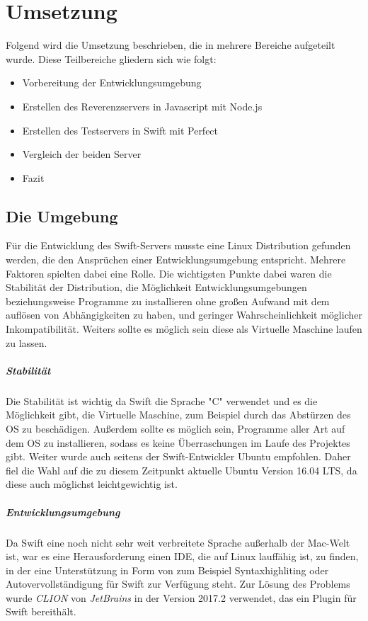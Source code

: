 \chapter{Umsetzung}\label{chap:Umsetzung}

\chapterstart

Folgend wird die Umsetzung beschrieben, die in mehrere Bereiche aufgeteilt wurde. Diese Teilbereiche gliedern sich wie folgt:
\begin{itemize}
	\item Vorbereitung der Entwicklungsumgebung
	\item Erstellen des Reverenzservers in Javascript mit Node.js
	\item Erstellen des Testservers in Swift mit Perfect
	\item Vergleich der beiden Server
	\item Fazit
\end{itemize}

\section{Die Umgebung}
\label{sec:dieumgebung}

Für die Entwicklung des Swift-Servers musste eine Linux Distribution gefunden werden, die den Ansprüchen einer Entwicklungsumgebung entspricht. Mehrere Faktoren spielten dabei eine Rolle. Die wichtigsten Punkte dabei waren die Stabilität der Distribution, die Möglichkeit Entwicklungsumgebungen beziehungsweise Programme zu installieren ohne großen Aufwand mit dem auflösen von Abhängigkeiten zu haben, und geringer Wahrscheinlichkeit möglicher Inkompatibilität. Weiters sollte es möglich sein diese als Virtuelle Maschine laufen zu lassen. 

\paragraph{Stabilität}
Die Stabilität ist wichtig da Swift die Sprache "C" verwendet und es die Möglichkeit gibt, die Virtuelle Maschine, zum Beispiel durch das Abstürzen des OS zu beschädigen. Außerdem sollte es möglich sein, Programme aller Art auf dem OS zu installieren, sodass es keine Überraschungen im Laufe des Projektes gibt. Weiter wurde auch seitens der Swift-Entwickler Ubuntu empfohlen. Daher fiel die Wahl auf die zu diesem Zeitpunkt aktuelle Ubuntu Version 16.04 LTS, da diese auch möglichst leichtgewichtig ist. 

\paragraph{Entwicklungsumgebung}
Da Swift eine noch nicht sehr weit verbreitete Sprache außerhalb der Mac-Welt ist, war es eine Herausforderung einen IDE, die auf Linux lauffähig ist, zu finden, in der eine Unterstützung in Form von zum Beispiel Syntaxhighliting oder Autovervollständigung für Swift zur Verfügung steht. Zur Lösung des Problems wurde \textit{CLION} von \textit{JetBrains} \parencite{jetbrain} in der Version 2017.2 verwendet, das ein Plugin für Swift bereithält.

